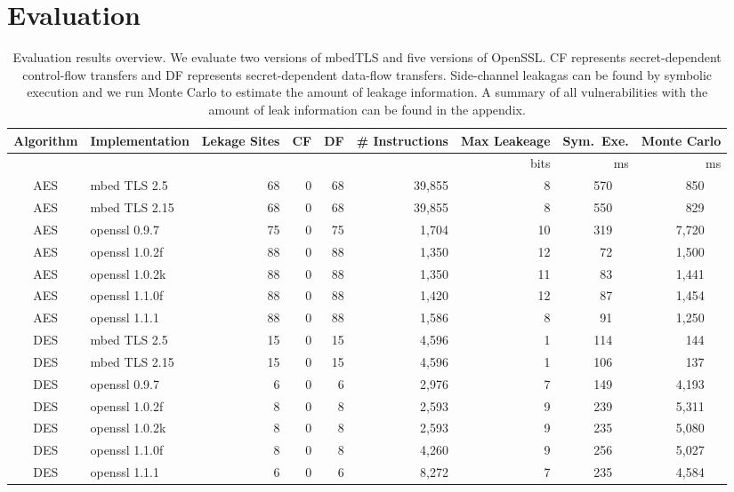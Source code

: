 \section{Evaluation}
\label{res_overview}
 
\begin{table}
\centering
\caption{Evaluation results overview. We evaluate two versions of mbedTLS and five
versions of OpenSSL\@. CF represents secret-dependent control-flow transfers and
DF represents secret-dependent data-flow transfers. Side-channel leakagas can
be found by symbolic execution and we run Monte Carlo to estimate the amount 
of leakage information. A summary of all vulnerabilities with the amount of
leak information can be found in the appendix.
}\label{fig:Testtt}
\begin{tabular}{clrrrrrrr}
\hline
\textbf{Algorithm} & \textbf{Implementation} & \textbf{Lekage Sites} & \textbf{CF} & \textbf{DF}
& \textbf{\# Instructions} & \textbf{Max Leakeage} & \textbf{Sym.\ Exe.} & \textbf{Monte Carlo}\\\hline
&&&&&& bits & ms & ms\\\cline{7-9}
AES & mbed TLS 2.5   & 68 & 0 & 68 & 39,855 & 8 & 570 ~~&   850 ~~\\
AES & mbed TLS 2.15  & 68 & 0 & 68 & 39,855 & 8 & 550 ~~&   829 ~~\\
AES & openssl 0.9.7  & 75 & 0 & 75 & 1,704 & 10 & 319 ~~& 7,720 ~~\\
AES & openssl 1.0.2f & 88 & 0 & 88 & 1,350 & 12 &  72 ~~& 1,500 ~~\\
AES & openssl 1.0.2k & 88 & 0 & 88 & 1,350 & 11 &  83 ~~& 1,441 ~~\\
AES & openssl 1.1.0f & 88 & 0 & 88 & 1,420 & 12 &  87 ~~& 1,454 ~~\\
AES & openssl 1.1.1  & 88 & 0 & 88 & 1,586 & 8 &   91 ~~& 1,250 ~~\\
DES & mbed TLS 2.5   & 15 & 0 & 15 & 4,596 & 1 &  114 ~~&   144 ~~\\
DES & mbed TLS 2.15  & 15 & 0 & 15 & 4,596 & 1 &  106 ~~&   137 ~~\\
DES & openssl 0.9.7  & 6 & 0 & 6 & 2,976 & 7 & 149 ~~& 4,193       ~~\\
DES & openssl 1.0.2f & 8 & 0 & 8 & 2,593 & 9 & 239 ~~& 5,311       ~~\\
DES & openssl 1.0.2k & 8 & 0 & 8 & 2,593 & 9 & 235 ~~& 5,080        ~~\\
DES & openssl 1.1.0f & 8 & 0 & 8 & 4,260 & 9 & 256 ~~& 5,027        ~~\\
DES & openssl 1.1.1  & 6 & 0 & 6 & 8,272 & 7 & 235 ~~& 4,584       ~~\\

\end{tabular}
\end{table}
